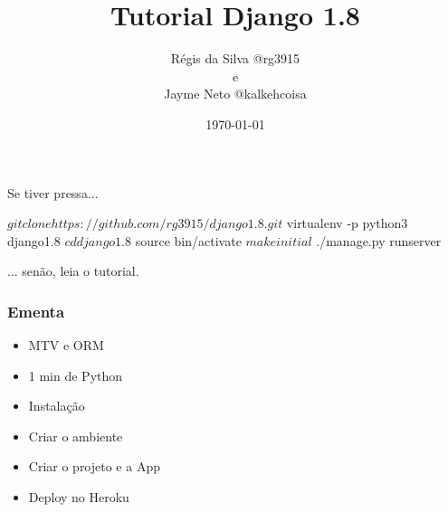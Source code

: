 \documentclass[aspectratio=169]{beamer}
\title{Tutorial Django 1.8}
\author{R\'egis da Silva {\texorpdfstring{\color{blue}}{ }@rg3915}\\ e\\ Jayme Neto \texorpdfstring{\color{blue}}{ }@kalkehcoisa}
\institute{Grupy-SP}
\date{\today}
\begin{document}
\justifying %

{%


\begin{frame}

\end{frame}
}

\begin{frame}
	\titlepage
\end{frame}

\begin{frame}[fragile]
	
Se tiver pressa...

\begin{bashcode}
	$ git clone https://github.com/rg3915/django1.8.git
	$ virtualenv -p python3 django1.8
	$ cd django1.8
	$ source bin/activate
	$ make initial
	$ ./manage.py runserver
\end{bashcode}

... sen\~ao, leia o tutorial.

\end{frame}

\begin{frame}\frametitle{Ementa}

\begin{itemize}
	\item MTV e ORM
	\item 1 min de Python
	\item Instala\c c\~ao
	\item Criar o ambiente
	\item Criar o projeto e a App
	\item Deploy no Heroku
\end{itemize}

\end{frame}
\end{document}
